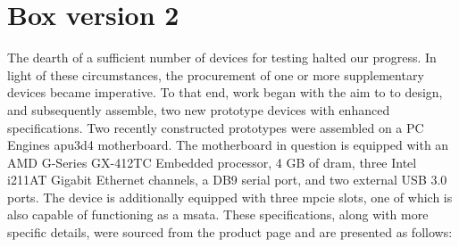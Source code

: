 \section{Box version 2}

The dearth of a sufficient number of devices for testing halted our progress. In light of these circumstances, the procurement of one or more supplementary devices became imperative. To that end, work began with the aim to to design, and subsequently assemble, two new prototype devices with enhanced specifications.
Two recently constructed prototypes were assembled on a PC Engines apu3d4 motherboard. The motherboard in question is equipped with an AMD G-Series GX-412TC Embedded processor, 4 GB of \gls{dram}, three Intel i211AT Gigabit Ethernet channels, a DB9 serial port, and two external USB 3.0 ports. The device is additionally equipped with three \gls{mpcie} slots, one of which is also capable of functioning as a \gls{msata}. 
These specifications, along with more specific details, were sourced from the product page and are presented as follows:


